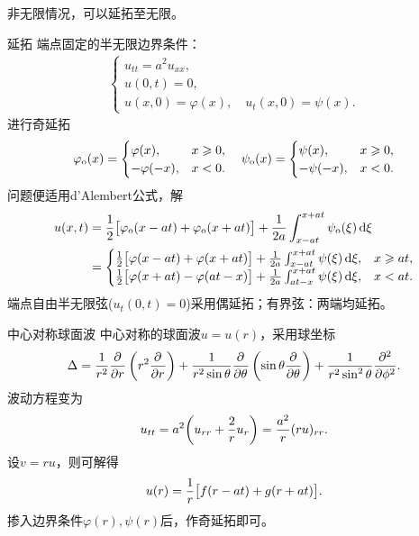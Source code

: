 非无限情况，可以延拓至无限。
\begin{example}{延拓}{}
	端点固定的半无限边界条件：
	\begin{align*}
		\begin{cases}
			u_{tt}=a^2u_{xx},\\
			u(0,t)=0,\\
			u(x,0)=\varphi(x),\quad u_t(x,0)=\psi(x).
		\end{cases}
	\end{align*}
	进行奇延拓
	\begin{align*}
		\varphi_\odd(x)=
		\begin{cases}
			\varphi(x),   & x\geqslant 0, \\
			-\varphi(-x), & x<0.
		\end{cases}
		\quad
		\psi_\odd(x)=
		\begin{cases}
			\psi(x),   & x\geqslant 0, \\
			-\psi(-x), & x<0.
		\end{cases}
	\end{align*}
	问题便适用d'Alembert公式，解
	\begin{align*}
		u(x,t) & =\frac12\bigfkh{\varphi_\odd(x-at)+\varphi_\odd(x+at)}+\frac1{2a}\int_{x-at}^{x+at}\psi_\odd(\xi)\d\xi \\
			   & = 
		\begin{cases}
			\frac12\bigfkh{\varphi(x-at)+\varphi(x+at)}+\frac1{2a}\int_{x-at}^{x+at}\psi(\xi)\d\xi, & x\geqslant at, \\
			\frac12\bigfkh{\varphi(x+at)-\varphi(at-x)}+\frac1{2a}\int_{at-x}^{x+at}\psi(\xi)\d\xi, & x<at.
		\end{cases}
	\end{align*}
	\tcblower
	端点自由半无限弦($u_t(0,t)=0$)采用偶延拓；有界弦：两端均延拓。
\end{example}
\begin{example}{中心对称球面波}{}
	中心对称的球面波$u=u(r)$，采用球坐标
	\[
		\lap=\frac1{r^2}\pp r\kh{r^2\pp r}+\frac1{r^2\sin\theta}\pp \theta\kh{\sin\theta\pp \theta}+\frac1{r^2\sin^2\theta}\pp[2]\phi.
	\]
	波动方程变为
	\[
		u_{tt}=a^2\biggkh{u_{rr}+\frac2ru_r}=\frac{a^2}r(ru)_{rr}.
	\]
	设$v=ru$，则可解得
	\[
		u(r)=\frac1r\bigfkh{f(r-at)+g(r+at)}.
	\]
	掺入边界条件$\varphi(r),\psi(r)$后，作奇延拓即可。
\end{example}
